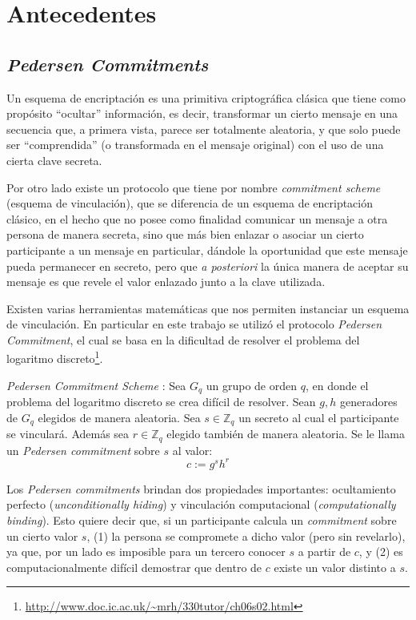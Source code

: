 \chapter{Antecedentes}\label{cap2}
\section{\emph{Pedersen Commitments}}

Un esquema de encriptación es una primitiva criptográfica clásica que tiene 
como propósito ``ocultar'' información, es decir, transformar un cierto 
mensaje en una secuencia que, a primera vista, parece ser totalmente 
aleatoria, y que solo puede ser ``comprendida'' (o transformada en el 
mensaje original) con el uso de una cierta clave secreta.

Por otro lado existe un protocolo que tiene por nombre 
\emph{commitment scheme} (esquema de vinculación), que se diferencia de un 
esquema de encriptación clásico, en el hecho que no posee como 
finalidad comunicar un mensaje a otra persona de manera secreta, sino que más 
bien enlazar o asociar un cierto participante a un mensaje en particular, 
dándole la oportunidad que este mensaje pueda permanecer en secreto, pero que 
\emph{a posteriori} la única manera de aceptar su 
mensaje es que revele el valor enlazado junto a la clave utilizada.

Existen varias herramientas matemáticas que nos permiten instanciar un 
esquema de vinculación. En particular en este 
trabajo se utilizó el protocolo 
\emph{Pedersen Commitment}\cite{pedersen1991non}, el cual se basa en la 
dificultad de resolver el problema del logaritmo 
discreto\footnote{\url{http://www.doc.ic.ac.uk/~mrh/330tutor/ch06s02.html}}.

\emph{Pedersen Commitment Scheme} \cite{pedersen1991non}: Sea $G_q$ un grupo 
de orden $q$, en donde el problema del logaritmo discreto se crea difícil 
de resolver. Sean $g,h$ generadores de $G_q$ elegidos de manera aleatoria. Sea 
$s \in \mathbb{Z}_q$ un secreto al cual el participante se vinculará. 
Además sea $r \in \mathbb{Z}_q$ elegido también de manera aleatoria. Se le 
llama un \emph{Pedersen commitment} sobre $s$ al valor: $$c := g^s h^r$$

Los \emph{Pedersen commitments} brindan dos propiedades importantes:  
ocultamiento perfecto (\emph{unconditionally hiding}) y 
vinculación computacional (\emph{computationally binding}). 
Esto quiere decir que, si un participante calcula un \emph{commitment} sobre 
un cierto valor $s$, (1) la persona se compromete a dicho valor (pero sin 
revelarlo), ya que, por un lado es imposible para un tercero conocer $s$ a 
partir de $c$, y (2) es computacionalmente difícil demostrar que dentro de $c$ 
existe un valor distinto a $s$.

